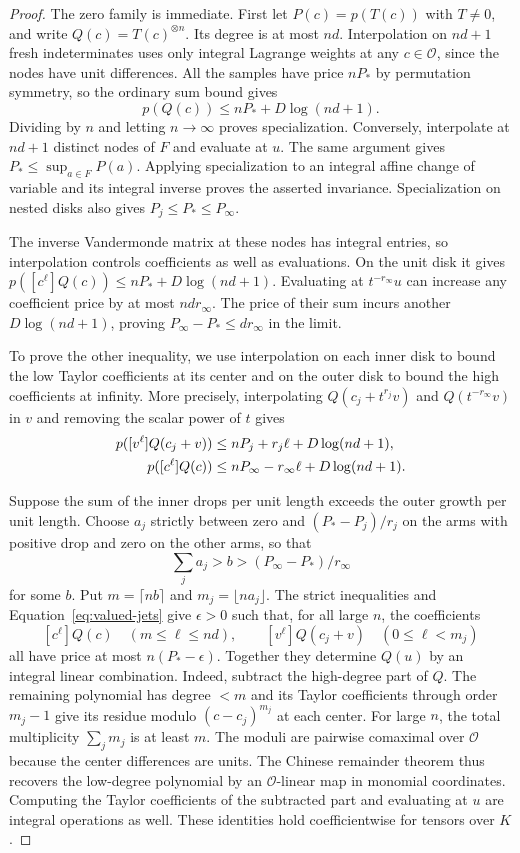 \begin{proof}
The zero family is immediate. First let $P(c)=p(T(c))$ with
$T\ne0$, and write $Q(c)=T(c)^{\otimes n}$. Its degree is at most
$nd$. Interpolation on $nd+1$ fresh indeterminates uses only integral
Lagrange weights at any $c\in\mathcal O$, since the nodes have unit
differences. All the samples have price $nP_*$ by permutation symmetry,
so the ordinary sum bound gives
\[
 p(Q(c))\le nP_*+D\log(nd+1).
\]
Dividing by $n$ and letting $n\to\infty$ proves specialization.
Conversely, interpolate at $nd+1$ distinct nodes of $F$ and evaluate
at $u$. The same argument gives $P_*\le\sup_{a\in F}P(a)$. Applying
specialization to an integral affine change of variable and its
integral inverse proves the asserted invariance. Specialization on
nested disks also gives $P_j\le P_*\le P_\infty$.

The inverse Vandermonde matrix at these nodes has integral entries,
so interpolation controls coefficients as well as evaluations.
On the unit disk it gives $p([c^\ell]Q(c))\le nP_*+D\log(nd+1)$.
Evaluating at $t^{-r_\infty}u$ can increase any coefficient price by
at most $nd r_\infty$. The price of their sum incurs another
$D\log(nd+1)$, proving $P_\infty-P_*\le d r_\infty$ in the limit.

To prove the other inequality, we use interpolation on each inner
disk to bound the low Taylor coefficients at its center and on the
outer disk to bound the high coefficients at infinity. More
precisely, interpolating $Q(c_j+t^{r_j}v)$ and $Q(t^{-r_\infty}v)$
in $v$ and removing the scalar power of $t$ gives
\begin{align}
 p([v^\ell]Q(c_j+v)) &\le nP_j+r_j\ell+D\log(nd+1),\notag\\
 p([c^\ell]Q(c)) &\le nP_\infty-r_\infty\ell+D\log(nd+1).
 \label{eq:valued-jets}
\end{align}

Suppose the sum of the inner drops per unit length exceeds the outer
growth per unit length. Choose $a_j$ strictly between zero and
$(P_*-P_j)/r_j$ on the arms with positive drop and zero on the other
arms, so that
\[
 \sum_j a_j>b>(P_\infty-P_*)/r_\infty
\]
for some $b$. Put $m=\lceil nb\rceil$ and $m_j=\lfloor na_j\rfloor$.
The strict inequalities and Equation~\eqref{eq:valued-jets} give
$\epsilon>0$ such that, for all large $n$, the coefficients
\[
 [c^\ell]Q(c)\quad(m\le\ell\le nd),\qquad
 [v^\ell]Q(c_j+v)\quad(0\le\ell<m_j)
\]
all have price at most $n(P_*-\epsilon)$. Together they determine $Q(u)$ by an integral linear combination.
Indeed, subtract the high-degree part of $Q$. The remaining polynomial
has degree $<m$ and its Taylor coefficients through order $m_j-1$
give its residue modulo $(c-c_j)^{m_j}$ at each center. For large
$n$, the total multiplicity $\sum_j m_j$ is at least $m$. The moduli
are pairwise comaximal over $\mathcal O$ because the center
differences are units. The Chinese remainder theorem thus recovers
the low-degree polynomial by an $\mathcal O$-linear map in monomial
coordinates. Computing the Taylor coefficients of the subtracted
part and evaluating at $u$ are integral operations as well. These
identities hold coefficientwise for tensors over $K$.


\end{proof}
